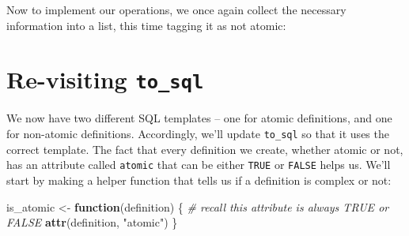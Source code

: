 \documentclass[]{book}
\newenvironment{Shaded}{\begin{snugshade}}{\end{snugshade}}
\newcommand{\CommentTok}[1]{\textcolor[rgb]{0.56,0.35,0.01}{\textit{#1}}}
\newcommand{\ControlFlowTok}[1]{\textcolor[rgb]{0.13,0.29,0.53}{\textbf{#1}}}
\newcommand{\DataTypeTok}[1]{\textcolor[rgb]{0.13,0.29,0.53}{#1}}
\newcommand{\KeywordTok}[1]{\textcolor[rgb]{0.13,0.29,0.53}{\textbf{#1}}}
\newcommand{\NormalTok}[1]{#1}
\newcommand{\OtherTok}[1]{\textcolor[rgb]{0.56,0.35,0.01}{#1}}
\newcommand{\StringTok}[1]{\textcolor[rgb]{0.31,0.60,0.02}{#1}}
\begin{document}
Now to implement our operations, we once again collect the necessary information into a list, this time tagging it as not atomic:

\begin{Shaded}
\end{Shaded}

\hypertarget{re-visiting-to_sql}{%
\section{\texorpdfstring{Re-visiting \texttt{to\_sql}}{Re-visiting to\_sql}}\label{re-visiting-to_sql}}

We now have two different SQL templates -- one for atomic definitions, and one for non-atomic definitions. Accordingly, we'll update \texttt{to\_sql} so that it uses the correct template. The fact that every definition we create, whether atomic or not, has an attribute called \texttt{atomic} that can be either \texttt{TRUE} or \texttt{FALSE} helps us. We'll start by making a helper function that tells us if a definition is complex or not:

\begin{Shaded}
\begin{Highlighting}[]
\NormalTok{is_atomic <-}\StringTok{ }\ControlFlowTok{function}\NormalTok{(definition) \{}
    \CommentTok{# recall this attribute is always TRUE or FALSE}
    \KeywordTok{attr}\NormalTok{(definition, }\StringTok{"atomic"}\NormalTok{)}
\NormalTok{\}}
\end{Highlighting}
\end{Shaded}
\end{document}
